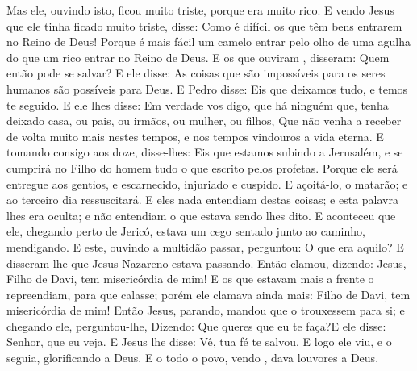 {  Mas ele, ouvindo isto, ficou muito triste, porque era muito rico.
  E vendo Jesus que ele tinha ficado muito triste, disse: Como é difícil os que têm
{} bens entrarem no Reino de Deus!
  Porque é mais fácil um camelo entrar pelo olho de uma agulha do que um rico entrar no Reino de Deus.
  E os que ouviram
{}, disseram: Quem então pode se salvar?
  E ele disse: As coisas que são impossíveis para os seres humanos são possíveis para Deus.
  E Pedro disse: Eis que deixamos tudo, e temos te seguido.
  E ele lhes disse: Em verdade vos digo, que há ninguém que, tenha deixado casa, ou pais, ou irmãos, ou mulher, ou filhos,
  Que não venha a receber de volta muito mais nestes tempos, e nos tempos vindouros
{} a vida eterna.
  E tomando consigo aos doze, disse-lhes: Eis que estamos subindo a Jerusalém, e se cumprirá no Filho do homem tudo o que
{} escrito pelos profetas.
  Porque ele será entregue aos gentios, e escarnecido, injuriado e cuspido.
  E
{} açoitá-lo, o matarão; e ao terceiro dia ressuscitará.
  E eles nada entendiam destas coisas; e esta palavra lhes era oculta; e não entendiam o que estava sendo lhes dito.
  E aconteceu que ele, chegando perto de Jericó, estava um cego sentado junto ao caminho, mendigando.
  E este, ouvindo a multidão passar, perguntou: O que era aquilo?
  E disseram-lhe que Jesus Nazareno estava passando.
  Então clamou, dizendo: Jesus, Filho de Davi, tem misericórdia de mim!
  E os que estavam mais a frente o repreendiam, para que calasse; porém ele clamava ainda mais: Filho de Davi, tem misericórdia de mim!
  Então Jesus, parando, mandou que o trouxessem para si; e chegando ele, perguntou-lhe,
  Dizendo: Que queres que eu te faça?E ele disse: Senhor, que eu veja.
  E Jesus lhe disse: Vê, tua fé te salvou.
  E logo ele viu, e o seguia, glorificando a Deus. E o todo o povo, vendo
{},  dava louvores a Deus.
\par }

